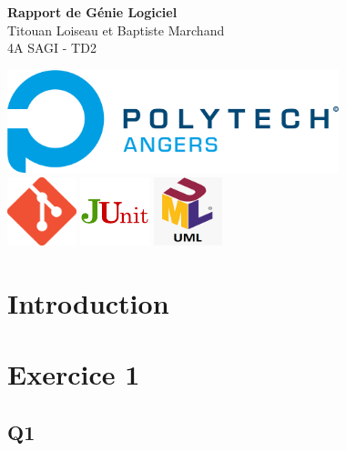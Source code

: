 \documentclass[12pt]{article}
\begin{document}
\begin{titlepage}
    \begin{center}
        \textbf{Rapport de Génie Logiciel} \\
        \vspace{0.5cm}
        Titouan Loiseau et Baptiste Marchand \\
        4A SAGI - TD2 \\
        \vspace{5cm}

        \includegraphics[height=3cm]{img/Polytech_Angers.png} \\
        \includegraphics[height=2cm]{img/git.png}
        \includegraphics[height=2cm]{img/junit.png}
        \includegraphics[height=2cm]{img/uml.png}
    \end{center}
\end{titlepage}

\tableofcontents
\pagebreak

\section*{Introduction}

\section{Exercice 1}
\subsection{Q1}
\end{document}
